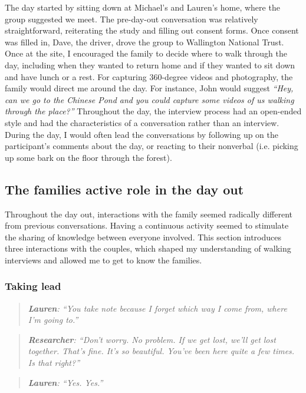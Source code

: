 The day started by sitting down at Michael's and Lauren's home, where the group suggested we meet. The pre-day-out conversation was relatively straightforward, reiterating the study and filling out consent forms. Once consent was filled in, Dave, the driver, drove the group to Wallington National Trust. Once at the site, I encouraged the family to decide where to walk through the day, including when they wanted to return home and if they wanted to sit down and have lunch or a rest. For capturing 360-degree videos and photography, the family would direct me around the day. For instance, John would suggest \textit{``Hey, can we go to the Chinese Pond and you could capture some videos of us walking through the place?''} Throughout the day, the interview process had an open-ended style and had the characteristics of a conversation rather than an interview. During the day, I would often lead the conversations by following up on the participant's comments about the day, or reacting to their nonverbal (i.e. picking up some bark on the floor through the forest).

\subsection{The families active role in the day out}
\label{ActiveRole}

Throughout the day out, interactions with the family seemed radically different from previous conversations. Having a continuous activity seemed to stimulate the sharing of knowledge between everyone involved. This section introduces three interactions with the couples, which shaped my understanding of walking interviews and allowed me to get to know the families.


\subsubsection{Taking lead}
\begin{quote}
\textit{   \textbf{Lauren}: ``You take note because I forget which way I come from, where I'm going to.''
}\end{quote}

\begin{quote}    
\textit{    \textbf{Researcher}: ``Don't worry. No problem. If we get lost, we'll get lost together. That's fine. It's so beautiful. You've been here quite a few times. Is that right?''
}    \end{quote}
    \begin{quote}    

\textit{    \textbf{Lauren}: ``Yes. Yes.''
}\end{quote}

